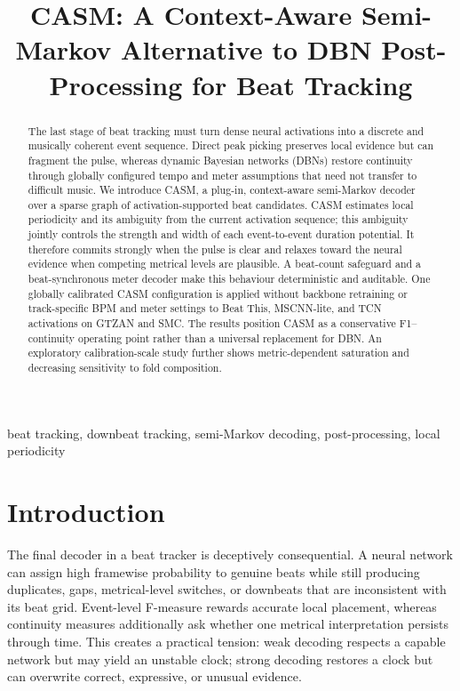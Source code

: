 \documentclass{article}
\title{CASM: A Context-Aware Semi-Markov Alternative to DBN Post-Processing for Beat Tracking}
\begin{document}
\ninept
\maketitle

\begin{abstract}
The last stage of beat tracking must turn dense neural activations into a
discrete and musically coherent event sequence. Direct peak picking preserves
local evidence but can fragment the pulse, whereas dynamic Bayesian networks
(DBNs) restore continuity through globally configured tempo and meter
assumptions that need not transfer to difficult music. We introduce CASM, a
plug-in, context-aware semi-Markov decoder over a sparse graph of
activation-supported beat candidates. CASM estimates local periodicity and its
ambiguity from the current activation sequence; this ambiguity jointly controls
the strength and width of each event-to-event duration potential. It therefore
commits strongly when the pulse is clear and relaxes toward the neural evidence
when competing metrical levels are plausible. A beat-count safeguard and a
beat-synchronous meter decoder make this behaviour deterministic and
auditable. One globally calibrated CASM configuration is applied without
backbone retraining or track-specific BPM and meter settings to Beat This,
MSCNN-lite, and TCN activations on GTZAN and SMC. The results position CASM as
a conservative F1--continuity operating point rather than a universal
replacement for DBN. An exploratory calibration-scale study further shows
metric-dependent saturation and decreasing sensitivity to fold composition.
\end{abstract}

\begin{keywords}
beat tracking, downbeat tracking, semi-Markov decoding, post-processing,
local periodicity
\end{keywords}

\section{Introduction}
\label{sec:intro}

The final decoder in a beat tracker is deceptively consequential. A neural
network can assign high framewise probability to genuine beats while still
producing duplicates, gaps, metrical-level switches, or downbeats that are
inconsistent with its beat grid. Event-level F-measure rewards accurate local
placement, whereas continuity measures additionally ask whether one metrical
interpretation persists through time. This creates a practical tension:
weak decoding respects a capable network but may yield an unstable clock;
strong decoding restores a clock but can overwrite correct, expressive, or
unusual evidence.
\end{document}
